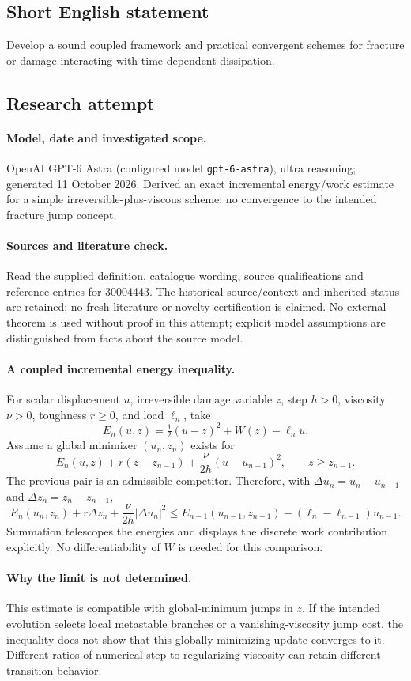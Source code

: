 \documentclass[11pt]{article}
\begin{document}
\subsection{Short English statement}
Develop a sound coupled framework and practical convergent schemes for fracture or damage interacting with time-dependent dissipation.
\subsection{Research attempt}
\paragraph{Model, date and investigated scope.}
OpenAI GPT-6 Astra (configured model \texttt{gpt-6-astra}), ultra reasoning; generated 11 October 2026. Derived an exact incremental energy/work estimate for a simple irreversible-plus-viscous scheme; no convergence to the intended fracture jump concept.

\paragraph{Sources and literature check.}
Read the supplied definition, catalogue wording, source qualifications and reference entries for 30004443. The historical source/context and inherited status are retained; no fresh literature or novelty certification is claimed. No external theorem is used without proof in this attempt; explicit model assumptions are distinguished from facts about the source model.

\paragraph{A coupled incremental energy inequality.} For scalar displacement \(u\), irreversible damage variable \(z\), step \(h>0\), viscosity \(\nu>0\), toughness \(r\ge0\), and load \(\ell_n\), take
\[
 E_n(u,z)=\tfrac12(u-z)^2+W(z)-\ell_nu.
\]
Assume a global minimizer \((u_n,z_n)\) exists for
\[
 E_n(u,z)+r(z-z_{n-1})+\frac{\nu}{2h}(u-u_{n-1})^2,
 \qquad z\ge z_{n-1}.
\]
The previous pair is an admissible competitor. Therefore, with \(\Delta u_n=u_n-u_{n-1}\) and \(\Delta z_n=z_n-z_{n-1}\),
\[
 E_n(u_n,z_n)+r\Delta z_n+\frac\nu{2h}|\Delta u_n|^2
 \le E_{n-1}(u_{n-1},z_{n-1})-(\ell_n-\ell_{n-1})u_{n-1}.
\]
Summation telescopes the energies and displays the discrete work contribution explicitly. No differentiability of \(W\) is needed for this comparison.
\paragraph{Why the limit is not determined.} This estimate is compatible with global-minimum jumps in \(z\). If the intended evolution selects local metastable branches or a vanishing-viscosity jump cost, the inequality does not show that this globally minimizing update converges to it. Different ratios of numerical step to regularizing viscosity can retain different transition behavior.
\end{document}
